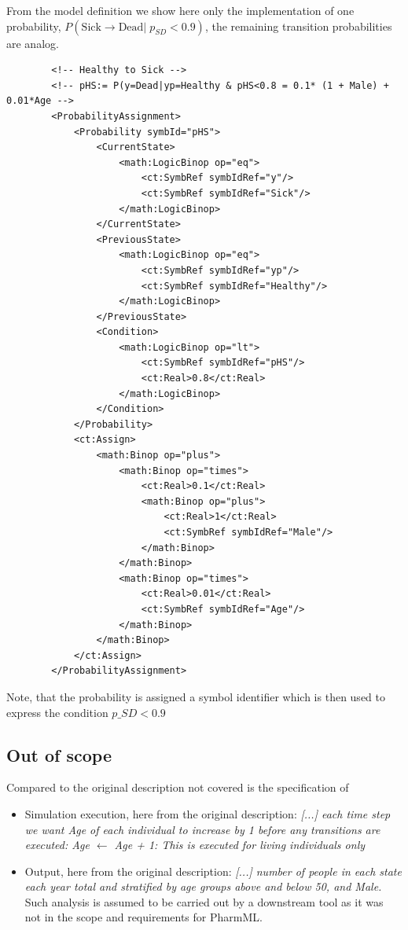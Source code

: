 From the model definition we show here only the implementation of one
probability, $P(\mbox{Sick} \rightarrow \mbox{Dead} | \; p_{SD} < 0.9)$, the remaining transition 
probabilities are analog.
\lstset{language=XML}
\begin{lstlisting}
        <!-- Healthy to Sick -->
        <!-- pHS:= P(y=Dead|yp=Healthy & pHS<0.8 = 0.1* (1 + Male) +  0.01*Age -->
        <ProbabilityAssignment>
            <Probability symbId="pHS">
                <CurrentState>
                    <math:LogicBinop op="eq">
                        <ct:SymbRef symbIdRef="y"/>
                        <ct:SymbRef symbIdRef="Sick"/>
                    </math:LogicBinop>
                </CurrentState>
                <PreviousState>
                    <math:LogicBinop op="eq">
                        <ct:SymbRef symbIdRef="yp"/>
                        <ct:SymbRef symbIdRef="Healthy"/>
                    </math:LogicBinop>
                </PreviousState>
                <Condition>
                    <math:LogicBinop op="lt">
                        <ct:SymbRef symbIdRef="pHS"/>
                        <ct:Real>0.8</ct:Real>
                    </math:LogicBinop>
                </Condition>
            </Probability>
            <ct:Assign>
                <math:Binop op="plus">
                    <math:Binop op="times">
                        <ct:Real>0.1</ct:Real>
                        <math:Binop op="plus">
                            <ct:Real>1</ct:Real>
                            <ct:SymbRef symbIdRef="Male"/>
                        </math:Binop>
                    </math:Binop>
                    <math:Binop op="times">
                        <ct:Real>0.01</ct:Real>
                        <ct:SymbRef symbIdRef="Age"/>
                    </math:Binop>
                </math:Binop>
            </ct:Assign>
        </ProbabilityAssignment>
\end{lstlisting}
Note, that the probability is assigned a symbol identifier 
which is then used to express the condition $p\_{SD}<0.9$

\subsection*{Out of scope}
Compared to the original description not covered is the specification of 
\begin{itemize}
\item 
Simulation execution, here from the original description: \emph{ [...] each time 
step we want Age of each individual to increase by 1 before any transitions 
are executed: Age $\leftarrow$ Age + 1: This is executed for living individuals only}
\item 
Output, here from the original description: \emph{[...] number of people in each 
state each year total and stratified by age groups above and below 50, and Male.} \\
Such analysis is assumed to be carried out by a downstream tool as it was 
not in the scope and requirements for PharmML.
\end{itemize}


